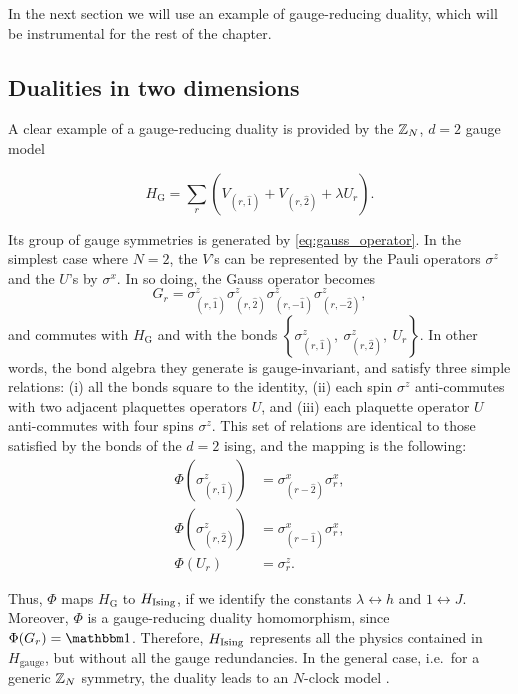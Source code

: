 In the next section we will use an example of gauge-reducing duality, which will be instrumental for the rest of the chapter.


\subsection{Dualities in two dimensions}
\label{sub:dualities_in_two_dimensions}


A clear example of a gauge-reducing duality is provided by the $\mathbb{Z}_N$, $d=2$ gauge model

\begin{equation}
	H_{\text{G}} = \sum_r \left( V_{(r,\hat{1})} + V_{(r,\hat{2})} + \lambda U_r \right).
\end{equation}

Its group of gauge symmetries is generated by \eqref{eq:gauss_operator}. In the simplest case where $N=2$, the $V$'s can be represented by the Pauli operators $\sigma^z$ and the $U$'s by $\sigma^x$. In so doing, the Gauss operator becomes
\begin{equation}
	G_r =
	\sigma^z_{(r, \hat{1})}
	\sigma^z_{(r, \hat{2})}
	\sigma^z_{(r, -\hat{1})}
	\sigma^z_{(r, -\hat{2})},
	\label{eq:gauss_operator_Z2}
\end{equation}
and commutes with $H_{\text{G}}$ and with the bonds $\left\{\sigma^z_{(r,\hat{1})},\ \sigma^z_{(r,\hat{2})},\ U_r\right\} $.
In other words, the bond algebra they generate is gauge-invariant, and satisfy three simple relations: (i) all the bonds square to the identity, (ii) each spin $\sigma^z$ anti-commutes with two adjacent plaquettes operators $U$, and (iii) each plaquette operator $U$ anti-commutes with four spins $\sigma^z$.
This set of relations are identical to those satisfied by the bonds of the $d=2$ \ac{ising}, and the mapping is the following:
\begin{equation}
    \begin{split}
        \Phi\left( \sigma^z_{(r,\hat{1})} \right) & = \sigma^x_{(r-\hat{2})} \sigma^x_r, \\
        \Phi\left( \sigma^z_{(r,\hat{2})} \right) & = \sigma^x_{(r-\hat{1})} \sigma^x_r, \\
        \Phi(U_r) & = \sigma^z_r.
    \end{split}
    \label{eq:duality_2d}
\end{equation}

Thus, $\Phi$ maps $H_{\text{G}}$ to $H_{\text{Ising}}$, if we identify the constants $\lambda \leftrightarrow h$ and $1 \leftrightarrow J$.
Moreover, $\Phi$ is a gauge-reducing duality homomorphism, since $\Phi(G_r) = \identity$.
Therefore, $H_{\text{Ising}}$ represents all the physics contained in $H_{\text{gauge}}$, but without all the gauge redundancies.
In the general case, i.e.~for a generic $\mathbb{Z}_N$ symmetry, the duality leads to an $N$-clock model \cite{radicevic2019spin}.

